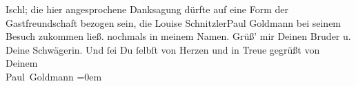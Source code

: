 \begin{ledgroupsized}[t]{13cm}
{{{                     Ischl; die hier angesprochene Danksagung
                  dürfte auf eine Form der Gastfreundschaft bezogen sein, die Louise SchnitzlerPaul Goldmann bei seinem Besuch zukommen
                  ließ.}}}\label{K_L02612-11h} nochmals in meinem Namen. Grüß’ mir Deinen Bruder u. Deine Schwägerin.\pend
           \pstart
           {\pb}Und ſei Du ſelbſt von Herzen und in Treue gegrüßt
               von{\\[\baselineskip]} Deinem{\\[\baselineskip]}\spacefill\mbox{Paul Goldmann}\pend
           \leftskip=0em{}
         
         \endnumbering{}\end{ledgroupsized}  \newcommand{\dateiname}{L02612}\newcommand{\titel}{Paul Goldmann an Arthur Schnitzler, 8. 9. [1894]}\newcommand{\editorInnen}{Martin Anton Müller und Laura Untner}
      